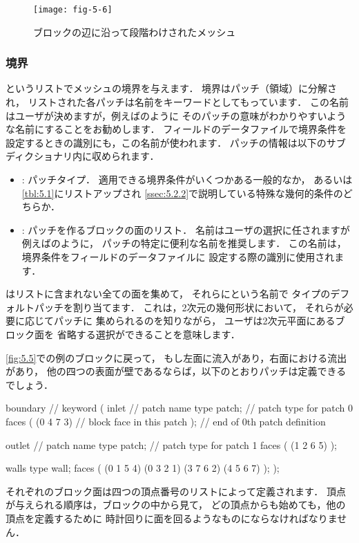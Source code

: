 \begin{figure}[ht]
 \texttt{[image: fig-5-6]}
 \caption{ブロックの辺に沿って段階わけされたメッシュ}
 \label{fig:5.6}
\end{figure}


\subsubsection{境界}
\label{sssec:5.3.1.4}
%
%
というリストでメッシュの境界を与えます．
境界はパッチ（領域）に分解され，
リストされた各パッチは名前をキーワードとしてもっています．
この名前はユーザが決めますが，例えばのように
そのパッチの意味がわかりやすいような名前にすることをお勧めします．
フィールドのデータファイルで境界条件を設定するときの識別にも，この名前が使われます．
パッチの情報は以下のサブディクショナリ内に収められます．
\begin{itemize}
 \item {}:
       パッチタイプ．
       適用できる境界条件がいくつかある一般的なか，
       あるいは\autoref{tbl:5.1}にリストアップされ
       \autoref{ssec:5.2.2}で説明している特殊な幾何的条件のどちらか．
 \item {}:
       パッチを作るブロックの面のリスト．
       名前はユーザの選択に任されますが
       例えばのように，
       パッチの特定に便利な名前を推奨します．
       この名前は，境界条件をフィールドのデータファイルに
       設定する際の識別に使用されます．
\end{itemize}
はリストに含まれない全ての面を集めて，
それらにという名前で
タイプのデフォルトパッチを割り当てます．
これは，2次元の幾何形状において，
それらが必要に応じてパッチに
集められるのを知りながら，
ユーザは2次元平面にあるブロック面を
省略する選択ができることを意味します．

\autoref{fig:5.5}での例のブロックに戻って，
もし左面に流入があり，右面における流出があり，
他の四つの表面が壁であるならば，以下のとおりパッチは定義できるでしょう．
\begin{OFverbatim}[file]
boundary               // keyword
(
    inlet              // patch name
    {
        type patch;    // patch type for patch 0
        faces
        (
            (0 4 7 3)  // block face in this patch
        );
    }                  // end of 0th patch definition

    outlet             // patch name
    {
        type patch;    // patch type for patch 1
        faces
        (
            (1 2 6 5)
        );
    }

    walls
    {
        type wall;
        faces
        (
            (0 1 5 4)
            (0 3 2 1)
            (3 7 6 2)
            (4 5 6 7)
        );
    }
);
\end{OFverbatim}
それぞれのブロック面は四つの頂点番号のリストによって定義されます．
頂点が与えられる順序は，ブロックの中から見て，
どの頂点からも始めても，他の頂点を定義するために
時計回りに面を回るようなものにならなければなりません．

